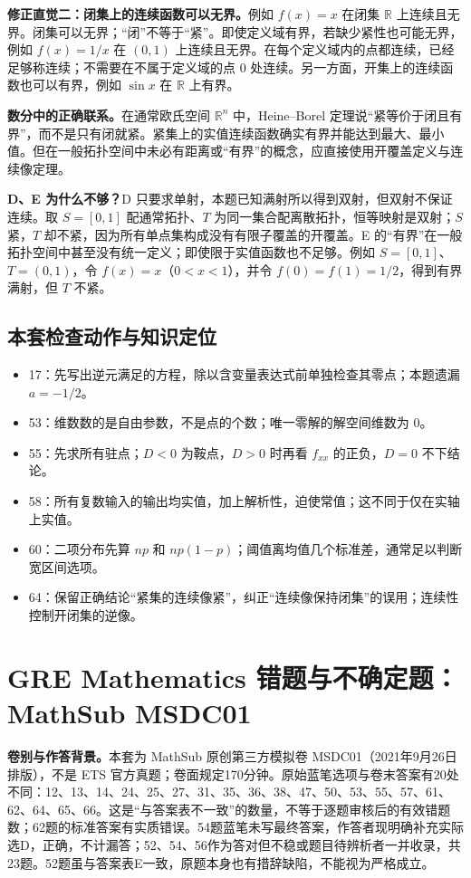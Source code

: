 \documentclass[11pt,a4paper,fontset=fandol]{ctexart}
\begin{document}
\textbf{修正直觉二：闭集上的连续函数可以无界。}例如 $f(x)=x$ 在闭集 $\mathbb R$ 上连续且无界。闭集可以无界；“闭”不等于“紧”。即使定义域有界，若缺少紧性也可能无界，例如 $f(x)=1/x$ 在 $(0,1)$ 上连续且无界。在每个定义域内的点都连续，已经足够称连续；不需要在不属于定义域的点 0 处连续。另一方面，开集上的连续函数也可以有界，例如 $\sin x$ 在 $\mathbb R$ 上有界。

\textbf{数分中的正确联系。}在通常欧氏空间 $\mathbb R^n$ 中，Heine--Borel 定理说“紧等价于闭且有界”，而不是只有闭就紧。紧集上的实值连续函数确实有界并能达到最大、最小值。但在一般拓扑空间中未必有距离或“有界”的概念，应直接使用开覆盖定义与连续像定理。

\textbf{D、E 为什么不够？}D 只要求单射，本题已知满射所以得到双射，但双射不保证连续。取 $S=[0,1]$ 配通常拓扑、$T$ 为同一集合配离散拓扑，恒等映射是双射；$S$ 紧，$T$ 却不紧，因为所有单点集构成没有有限子覆盖的开覆盖。E 的“有界”在一般拓扑空间中甚至没有统一定义；即使限于实值函数也不足够。例如 $S=[0,1]$、$T=(0,1)$，令 $f(x)=x$（$0<x<1$），并令 $f(0)=f(1)=1/2$，得到有界满射，但 $T$ 不紧。

\subsection{本套检查动作与知识定位}
\begin{itemize}
\item 17：先写出逆元满足的方程，除以含变量表达式前单独检查其零点；本题遗漏 $a=-1/2$。
\item 53：维数数的是自由参数，不是点的个数；唯一零解的解空间维数为 0。
\item 55：先求所有驻点；$D<0$ 为鞍点，$D>0$ 时再看 $f_{xx}$ 的正负，$D=0$ 不下结论。
\item 58：所有复数输入的输出均实值，加上解析性，迫使常值；这不同于仅在实轴上实值。
\item 60：二项分布先算 $np$ 和 $np(1-p)$；阈值离均值几个标准差，通常足以判断宽区间选项。
\item 64：保留正确结论“紧集的连续像紧”，纠正“连续像保持闭集”的误用；连续性控制开闭集的逆像。
\end{itemize}


\clearpage
\section{GRE Mathematics 错题与不确定题：MathSub MSDC01}
\label{ms:start}
\textbf{卷别与作答背景。}本套为 MathSub 原创第三方模拟卷 MSDC01（2021年9月26日排版），不是 ETS 官方真题；卷面规定170分钟。原始蓝笔选项与卷末答案有20处不同：12、13、14、24、25、27、31、35、36、38、47、50、53、55、57、61、62、64、65、66。这是“与答案表不一致”的数量，不等于逐题审核后的有效错题数；62题的标准答案有实质错误。54题蓝笔未写最终答案，作答者现明确补充实际选D，正确，不计漏答；52、54、56作为答对但不稳或题目待辨析者一并收录，共23题。52题虽与答案表E一致，原题本身也有措辞缺陷，不能视为严格成立。
\end{document}

